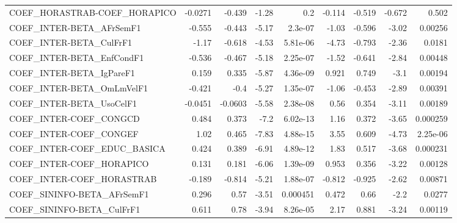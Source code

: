 \begin{tabular}{lrrrrrrrr}
COEF\_HORASTRAB-COEF\_HORAPICO          &     -0.0271 &       -0.439 &   -1.28 &      0.2 &     -0.114 &      -0.519 &       -0.672 &         0.502 \\
COEF\_INTER-BETA\_AFrSemF1              &      -0.555 &       -0.443 &   -5.17 &  2.3e-07 &      -1.03 &      -0.596 &        -3.02 &       0.00256 \\
COEF\_INTER-BETA\_CulFrF1               &       -1.17 &       -0.618 &   -4.53 & 5.81e-06 &      -4.73 &      -0.793 &        -2.36 &        0.0181 \\
COEF\_INTER-BETA\_EnfCondF1             &      -0.536 &       -0.467 &   -5.18 & 2.25e-07 &      -1.52 &      -0.641 &        -2.84 &       0.00448 \\
COEF\_INTER-BETA\_IgPareF1              &       0.159 &        0.335 &   -5.87 & 4.36e-09 &      0.921 &       0.749 &         -3.1 &       0.00194 \\
COEF\_INTER-BETA\_OmLmVelF1             &      -0.421 &         -0.4 &   -5.27 & 1.35e-07 &      -1.06 &      -0.453 &        -2.89 &       0.00391 \\
COEF\_INTER-BETA\_UsoCelF1              &     -0.0451 &      -0.0603 &   -5.58 & 2.38e-08 &       0.56 &       0.354 &        -3.11 &       0.00189 \\
COEF\_INTER-COEF\_CONGCD                &       0.484 &        0.373 &    -7.2 & 6.02e-13 &       1.16 &       0.372 &        -3.65 &      0.000259 \\
COEF\_INTER-COEF\_CONGEF                &        1.02 &        0.465 &   -7.83 & 4.88e-15 &       3.55 &       0.609 &        -4.73 &      2.25e-06 \\
COEF\_INTER-COEF\_EDUC\_BASICA           &       0.424 &        0.389 &   -6.91 & 4.89e-12 &       1.83 &       0.517 &        -3.68 &      0.000231 \\
COEF\_INTER-COEF\_HORAPICO              &       0.131 &        0.181 &   -6.06 & 1.39e-09 &      0.953 &       0.356 &        -3.22 &       0.00128 \\
COEF\_INTER-COEF\_HORASTRAB             &      -0.189 &       -0.814 &   -5.21 & 1.88e-07 &     -0.812 &      -0.925 &        -2.62 &       0.00871 \\
COEF\_SININFO-BETA\_AFrSemF1            &       0.296 &         0.57 &   -3.51 & 0.000451 &      0.472 &        0.66 &         -2.2 &        0.0277 \\
COEF\_SININFO-BETA\_CulFrF1             &       0.611 &         0.78 &   -3.94 & 8.26e-05 &       2.17 &       0.881 &        -3.24 &       0.00119 \\

\end{tabular}
